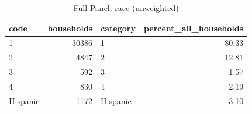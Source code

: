 \begin{table}
\caption{Full Panel: race (unweighted)}
\begin{tabular}{lrlr}
\toprule
code & households & category & percent\_all\_households \\
\midrule
1 & 30386 & 1 & 80.33 \\
2 & 4847 & 2 & 12.81 \\
3 & 592 & 3 & 1.57 \\
4 & 830 & 4 & 2.19 \\
Hispanic & 1172 & Hispanic & 3.10 \\
\bottomrule
\end{tabular}
\end{table}
